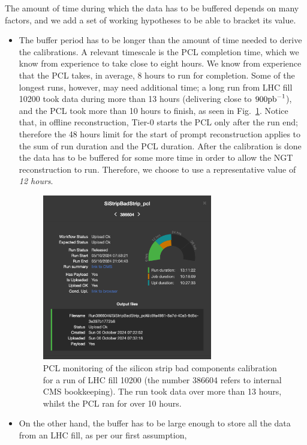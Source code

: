 The amount of time during which the data has to be buffered depends on many factors,
and we add a set of working hypotheses to be able to bracket its value.
\begin{itemize}
\item The buffer period has to be longer than the amount of time needed to derive the calibrations.
A relevant timescale is the PCL completion time, which we know from experience to take close to eight hours.
We know from experience that the PCL takes, in average, 8 hours to run for completion.
Some of the longest runs, however, may need additional time; a long run from LHC fill 10200 took data during more than 13 hours
(delivering close to $900\mathrm{pb}^{-1}$), and
the PCL took more than 10 hours to finish,
as seen in Fig.~\ref{fig:fill10200PCL}.
Notice that, in offline reconstruction, Tier-0 starts the PCL only after the run end; 
therefore the 48 hours limit for the start of prompt reconstruction applies to 
the sum of run duration and the PCL duration.
After the calibration is done the data has to be buffered for some more time in order to allow the NGT reconstruction to run.
Therefore, we choose to use a representative value of \emph{12 hours}.
\begin{figure}[htbp]
   \centering
	\includegraphics[width=0.7\textwidth]{figures/fill10200PCL.png}
   \caption{PCL monitoring of the silicon strip bad components calibration for a run of LHC fill 10200 (the number 386604 refers to internal CMS bookkeeping).
   The run took data over more than 13 hours, whilst the PCL ran for over 10 hours.}
   \label{fig:fill10200PCL}
\end{figure}
\item On the other hand, the buffer has to be large enough to store all the data from an LHC fill, as per our first assumption,

\end{itemize}

